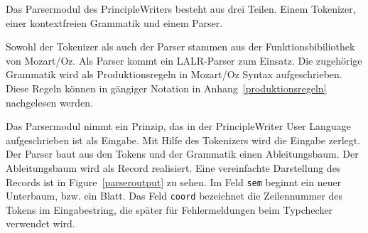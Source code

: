 Das Parsermodul des PrincipleWriters besteht aus drei Teilen. Einem
Tokenizer, einer kontextfreien Grammatik und einem Parser.

Sowohl der Tokenizer als auch der Parser stammen aus der
Funktionsbibiliothek von Mozart/Oz. Als Parser kommt ein
LALR-Parser zum Einsatz. Die zugeh\"orige Grammatik wird als
Produktionsregeln in Mozart/Oz Syntax aufgeschrieben. Diese Regeln
k\"onnen in g\"angiger Notation in Anhang~\ref{produktionsregeln}
nachgelesen werden.

Das Parsermodul nimmt ein Prinzip, das in der PrincipleWriter User
Language aufgeschrieben ist als Eingabe. Mit Hilfe des Tokenizers wird
die Eingabe zerlegt. Der Parser baut aus den Tokens und der Grammatik
einen Ableitungsbaum. Der Ableitungsbaum wird als Record realisiert.
Eine vereinfachte Darstellung des Records ist in
Figure~\ref{parseroutput} zu sehen. Im Feld {\tt sem} beginnt ein
neuer Unterbaum, bzw. ein Blatt. Das Feld {\tt coord} bezeichnet die
Zeilennummer des Tokens im Eingabestring, die sp\"ater f\"ur
Fehlermeldungen beim Typchecker verwendet wird.
